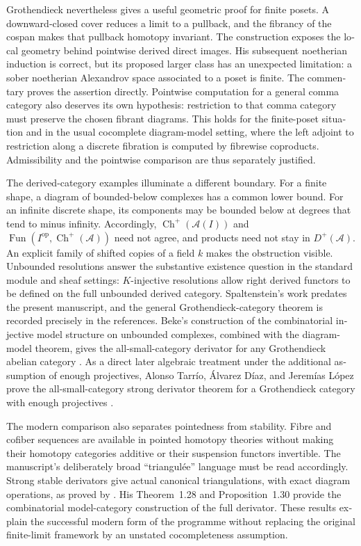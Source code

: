 \begin{otherlanguage}{english}
Grothendieck nevertheless gives a useful geometric proof for finite posets. A downward-closed cover reduces a limit to a pullback, and the fibrancy of the cospan makes that pullback homotopy invariant. The construction exposes the local geometry behind pointwise derived direct images. His subsequent noetherian induction is correct, but its proposed larger class has an unexpected limitation: a sober noetherian Alexandrov space associated to a poset is finite. The commentary proves the assertion directly. Pointwise computation for a general comma category also deserves its own hypothesis: restriction to that comma category must preserve the chosen fibrant diagrams. This holds for the finite-poset situation and in the usual cocomplete diagram-model setting, where the left adjoint to restriction along a discrete fibration is computed by fibrewise coproducts. Admissibility and the pointwise comparison are thus separately justified.

The derived-category examples illuminate a different boundary. For a finite shape, a diagram of bounded-below complexes has a common lower bound. For an infinite discrete shape, its components may be bounded below at degrees that tend to minus infinity. Accordingly, $\operatorname{Ch}^+(\mathcal A(I))$ and $\operatorname{Fun}(I^{\mathrm{op}},\operatorname{Ch}^+(\mathcal A))$ need not agree, and products need not stay in $D^+(\mathcal A)$. An explicit family of shifted copies of a field $k$ makes the obstruction visible. Unbounded resolutions answer the substantive existence question in the standard module and sheaf settings: $K$-injective resolutions allow right derived functors to be defined on the full unbounded derived category. Spaltenstein's work predates the present manuscript, and the general Grothendieck-category theorem is recorded precisely in the references. Beke's construction of the combinatorial injective model structure on unbounded complexes, combined with the diagram-model theorem, gives the all-small-category derivator for any Grothendieck abelian category \citep[Proposition~3.13]{Beke2000}. As a direct later algebraic treatment under the additional assumption of enough projectives, Alonso Tarr\'io, \'Alvarez D\'iaz, and Jerem\'ias L\'opez prove the all-small-category strong derivator theorem for a Grothendieck category with enough projectives \citep[Theorem~3.4, arXiv version~3]{AlonsoAlvarezJeremias2023}.

The modern comparison also separates pointedness from stability. Fibre and cofiber sequences are available in pointed homotopy theories without making their homotopy categories additive or their suspension functors invertible. The manuscript's deliberately broad ``triangul\'ee'' language must be read accordingly. Strong stable derivators give actual canonical triangulations, with exact diagram operations, as proved by \citet[Theorem~4.16 and Proposition~4.18]{Groth2013}. His Theorem~1.28 and Proposition~1.30 provide the combinatorial model-category construction of the full derivator. These results explain the successful modern form of the programme without replacing the original finite-limit framework by an unstated cocompleteness assumption.


\end{otherlanguage}

